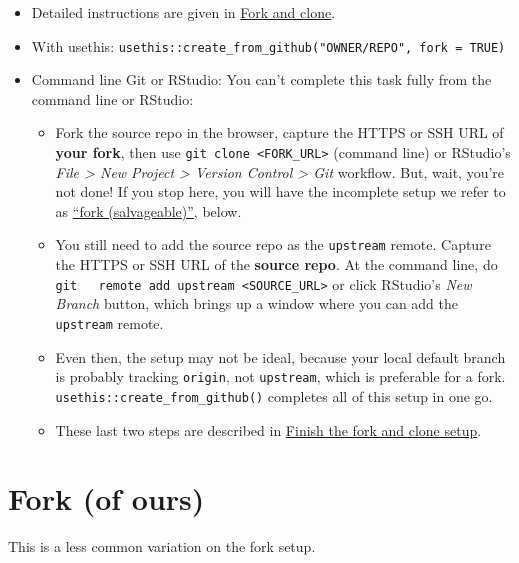 \documentclass[
]{book}
\providecommand{\tightlist}{%
  \setlength{\itemsep}{0pt}\setlength{\parskip}{0pt}}
\begin{document}
\begin{itemize}
\tightlist
\item
  Detailed instructions are given in \hyperref[fork-and-clone]{Fork and clone}.
\item
  With usethis: \texttt{usethis::create\_from\_github("OWNER/REPO",\ fork\ =\ TRUE)}
\item
  Command line Git or RStudio: You can't complete this task fully from the
  command line or RStudio:

  \begin{itemize}
  \tightlist
  \item
    Fork the source repo in the browser, capture the HTTPS or SSH
    URL of \textbf{your fork}, then use \texttt{git\ clone\ \textless{}FORK\_URL\textgreater{}}
    (command line) or RStudio's \emph{File \textgreater{} New Project \textgreater{} Version Control \textgreater{} Git}
    workflow. But, wait, you're not done! If you stop here, you will have the
    incomplete setup we refer to as
    \hyperref[fork_upstream_is_not_origin_parent]{``fork (salvageable)''}, below.
  \item
    You still need to add the source repo as the \texttt{upstream} remote. Capture
    the HTTPS or SSH URL of the \textbf{source repo}. At the command line, do \texttt{git\ \ \ remote\ add\ upstream\ \textless{}SOURCE\_URL\textgreater{}} or click RStudio's \emph{New Branch} button,
    which brings up a window where you can add the \texttt{upstream} remote.
  \item
    Even then, the setup may not be ideal, because your local default branch
    is probably tracking \texttt{origin}, not \texttt{upstream}, which is preferable for
    a fork. \texttt{usethis::create\_from\_github()} completes all of this setup in
    one go.
  \item
    These last two steps are described in
    \hyperref[fork-and-clone-finish]{Finish the fork and clone setup}.
  \end{itemize}
\end{itemize}

\section{Fork (of ours)}\label{fork-of-ours}

This is a less common variation on the fork setup.
\end{document}
